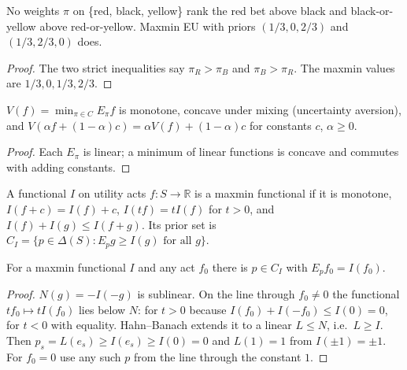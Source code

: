 \begin{theorem}[Ellsberg]
\label{thm:beh-ellsberg}
\leanok
No weights $\pi$ on \{red, black, yellow\} rank the red bet above black and black-or-yellow above
red-or-yellow. Maxmin EU with priors $(1/3,0,2/3)$ and $(1/3,2/3,0)$ does.
\end{theorem}
\begin{proof}
\leanok
The two strict inequalities say $\pi_R>\pi_B$ and $\pi_B>\pi_R$. The maxmin values are $1/3,0,1/3,2/3$.
\end{proof}

\begin{theorem}
\label{thm:beh-gs}
\leanok
$V(f)=\min_{\pi\in C}E_\pi f$ is monotone, concave under mixing (uncertainty aversion), and
$V(\alpha f+(1-\alpha)c)=\alpha V(f)+(1-\alpha)c$ for constants $c$, $\alpha\ge0$.
\end{theorem}
\begin{proof}
\leanok
Each $E_\pi$ is linear; a minimum of linear functions is concave and commutes with adding constants.
\end{proof}

\begin{definition}
\label{def:beh-maxmin-functional}
\leanok
A functional $I$ on utility acts $f:S\to\mathbb{R}$ is a maxmin functional if it is monotone, $I(f+c)=I(f)+c$,
$I(tf)=tI(f)$ for $t>0$, and $I(f)+I(g)\le I(f+g)$. Its prior set is
$C_I=\{p\in\Delta(S): E_pg\ge I(g)\text{ for all }g\}$.
\end{definition}

\begin{lemma}
\label{lem:beh-gs-support}
\leanok
{}
For a maxmin functional $I$ and any act $f_0$ there is $p\in C_I$ with $E_pf_0=I(f_0)$.
\end{lemma}
\begin{proof}
\leanok
$N(g)=-I(-g)$ is sublinear. On the line through $f_0\ne0$ the functional $tf_0\mapsto tI(f_0)$ lies below $N$:
for $t>0$ because $I(f_0)+I(-f_0)\le I(0)=0$, for $t<0$ with equality. Hahn--Banach extends it to a linear $L\le N$,
i.e.\ $L\ge I$. Then $p_s=L(e_s)\ge I(e_s)\ge I(0)=0$ and $L(1)=1$ from $I(\pm1)=\pm1$. For $f_0=0$ use any such $p$
from the line through the constant $1$.
\end{proof}

